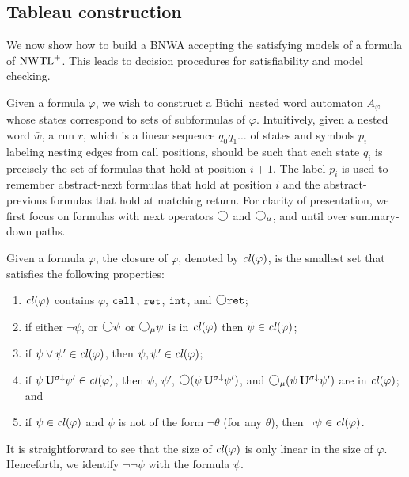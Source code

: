 \documentclass{LMCS}
\newcommand{\M}{{\mu}}
\newcommand{\w}{{\bar{w}}}
\newcommand{\dm}{\Diamond}
\newcommand{\U}{{\mathbf U}}
\newcommand{\next}{\text{\raisebox{1pt}{$\bigcirc$}}}
\theoremstyle{plain}
\theoremstyle{definition}
\newcommand{\ppath}{\sigma} \newcommand{\Ul}{\U}
\newcommand{\retr}{\mathit{ret}}
\renewcommand{\int}{\intt}
\def\Cl{{\it cl\/}}
\def\buchi{B\"{u}chi}
\newcommand{\dpuntil}{{\,\U^{\ppath\downarrow}}}
\newcommand{\nwtlp}{\nwtl^+}
\newcommand{\intt}{{\tt int}}
\newcommand{\rett}{{\tt ret}}
\newcommand{\call}{{\tt call}}
\renewcommand{\retr}{\rett}
\newcommand{\dmm}{\dm_{\M}}
\renewcommand{\dm}{\next}
\renewcommand{\dmm}{\dm_\M}
\begin{document}
\subsection{Tableau construction}



We now show how to build a BNWA
accepting the satisfying models of a formula of $\nwtlp$.
This leads to decision procedures for satisfiability and
model checking.


Given a formula $\varphi$, we wish to construct a \buchi\ nested word
automaton $A_\varphi$ whose states correspond to sets of subformulas
of $\varphi$.  Intuitively, given a nested word $\w$, a run $r$, which
is a linear sequence $q_0q_1\ldots$ of states and symbols $p_i$
labeling nesting edges from call positions, should be such that each state $q_i$ is
precisely the set of formulas that hold at position $i+1$. The label
$p_i$ is used to remember abstract-next formulas that hold at
position $i$ and the abstract-previous formulas that hold at matching return.
For clarity of presentation, we first focus on formulas with next
operators $\dm$ and $\dmm$, and until over summary-down paths.  



Given a formula $\varphi$, the closure of $\varphi$, denoted by
$\Cl(\varphi)$, is the smallest set that satisfies the following
properties: 
\begin{enumerate}[$\bullet$]
\item
$\Cl(\varphi)$ contains $\varphi$, $\call$, $\retr$,
$\int$, and $\next\retr$; 
\item
if either $\neg \psi$, or $\next\psi$ or
$\dmm\psi$ is in $\Cl(\varphi)$ then $\psi \in \Cl(\varphi)$; 
\item 
if $\psi \vee \psi' \in \Cl(\varphi)$, then $\psi,\psi' \in \Cl(\varphi)$;
\item
if $\psi \dpuntil \psi'\in\Cl(\varphi)$, then $\psi$, $\psi'$,
$\next(\psi\dpuntil \psi')$, and 
$\dmm(\psi\dpuntil\psi')$ are in
$\Cl(\varphi)$; and
\item
if $\psi \in \Cl(\varphi)$ and $\psi$ is not of
the form $\neg \theta$ (for any $\theta$), then $\neg \psi \in
\Cl(\varphi)$. 
\end{enumerate}
It is straightforward to see that the size of
$\Cl(\varphi)$ is only linear in the size of $\varphi$.  Henceforth,
we identify $\neg \neg \psi$ with the formula $\psi$.
\end{document}
